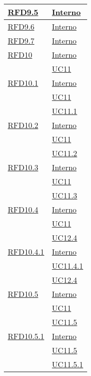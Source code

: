 \begin{longtable}{|>{\centering}m{5cm}|m{5cm}<{\centering}|}
\hyperlink{RFD9.5}{RFD9.5} & \hyperlink{Interno}{Interno}\\ \hline

\hyperlink{RFD9.6}{RFD9.6} & \hyperlink{Interno}{Interno}\\ \hline

\hyperlink{RFD9.7}{RFD9.7} & \hyperlink{Interno}{Interno}\\ \hline

\hyperlink{RFD10}{RFD10} & \hyperlink{Interno}{Interno}\\
& \hyperref[UC11]{UC11}\\ \hline

\hyperlink{RFD10.1}{RFD10.1} & \hyperlink{Interno}{Interno}\\
& \hyperref[UC11]{UC11}\\
& \hyperref[UC11.1]{UC11.1}\\ \hline

\hyperlink{RFD10.2}{RFD10.2} & \hyperlink{Interno}{Interno}\\
& \hyperref[UC11]{UC11}\\
& \hyperref[UC11.2]{UC11.2}\\ \hline

\hyperlink{RFD10.3}{RFD10.3} & \hyperlink{Interno}{Interno}\\
& \hyperref[UC11]{UC11}\\
& \hyperref[UC11.3]{UC11.3}\\ \hline

\hyperlink{RFD10.4}{RFD10.4} & \hyperlink{Interno}{Interno}\\
& \hyperref[UC11]{UC11}\\
& \hyperref[UC12.4]{UC12.4}\\ \hline

\hyperlink{RFD10.4.1}{RFD10.4.1} & \hyperlink{Interno}{Interno}\\
& \hyperref[UC11.4.1]{UC11.4.1}\\
& \hyperref[UC12.4]{UC12.4}\\ \hline

\hyperlink{RFD10.5}{RFD10.5} & \hyperlink{Interno}{Interno}\\
& \hyperref[UC11]{UC11}\\
& \hyperref[UC11.5]{UC11.5}\\ \hline

\hyperlink{RFD10.5.1}{RFD10.5.1} & \hyperlink{Interno}{Interno}\\
& \hyperref[UC11.5]{UC11.5}\\
& \hyperref[UC11.5.1]{UC11.5.1}\\ \hline


\end{longtable}
